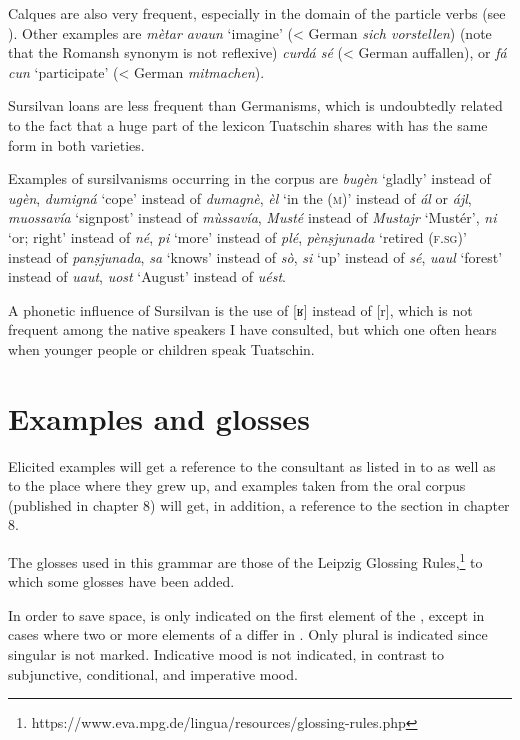 Calques are also very frequent, especially in the domain of the particle verbs (see ). Other examples are \textit{mètar avaun} `imagine' (< German \textit{sich vorstellen}) (note that the Romansh synonym is not reflexive) \textit{curdá sé} (< German auffallen), or \textit{fá cun} `participate' (< German \textit{mitmachen}).

Sursilvan loans are less frequent than Germanisms, which is undoubtedly related to the fact that a huge part of the lexicon Tuatschin shares with  has the same form in both varieties.

Examples of sursilvanisms occurring in the corpus are \textit{bugèn} `gladly' instead of \textit{ugèn}, \textit{dumigná} `cope' instead of \textit{dumagnè},  \textit{èl} `in the (\textsc{m})' instead of \textit{ál} or \textit{ájl}, \textit{muossavía} `signpost' instead of \textit{mùssavía}, \textit{Musté} instead of \textit{Mustajr} `Mustér', \textit{ni} `or; right' instead of \textit{né}, \textit{pi} `more' instead of \textit{plé}, \textit{pènṣjunada} `retired (\textsc{f.sg})' instead of \textit{panṣjunada}, \textit{sa} `knows' instead of \textit{sò}, \textit{si} `up' instead of \textit{sé}, \textit{uaul} `forest' instead of \textit{uaut}, \textit{uost} `August' instead of \textit{uést}.

A phonetic influence of Sursilvan is the use of [ʁ] instead of [r], which is not frequent among the native speakers I have consulted, but which one often hears when younger people or children speak Tuatschin.



\section{Examples and glosses}\label{sec:1.5}
Elicited examples will get a reference to the consultant as listed in 
 to  as well as to the place where they grew up, and examples taken from the oral corpus (published in chapter 8) will get, in addition, a reference to the section in chapter 8.

The glosses used in this grammar are those of the Leipzig Glossing Rules,\footnote{https://www.eva.mpg.de/lingua/resources/glossing-rules.php} to which some glosses have been added.

In order to save space,  is only indicated on the first element of the , except in cases where two or more elements of a  differ in . Only plural is indicated since singular is not marked. Indicative mood is not indicated, in contrast to subjunctive, conditional, and imperative mood.


